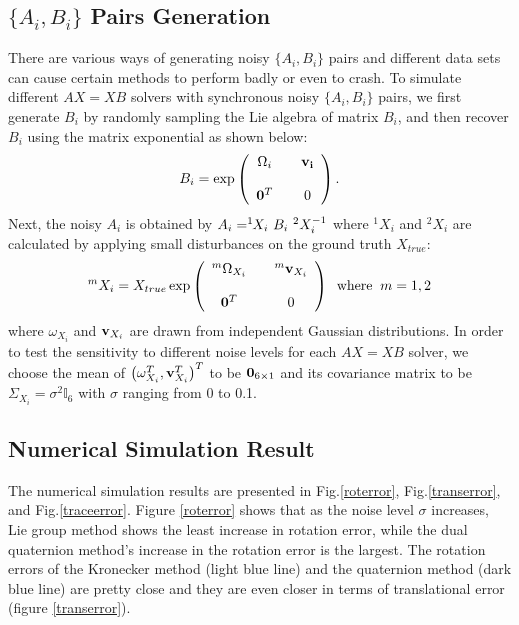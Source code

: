 \documentclass[twocolumn,10pt]{asme2ej}
\begin{document}
\subsection{$\{A_{i}, B_{i}\}$ Pairs Generation}
There are various ways of generating noisy $\{A_{i},B_{i}\}$ pairs and different data sets can cause certain methods to perform badly or even to crash. To simulate different $AX=XB$ solvers with synchronous noisy $\{A_{i},B_{i}\}$ pairs, we first generate $B_{i}$ by randomly sampling the Lie algebra of matrix $B_{i}$, and then recover $B_{i}$ using the matrix exponential as shown below:
\begin{equation}
B_{i} = \exp \left(
\begin{array}{ccc}
\Omega_{i}  & & {\bf v_{i}}  \\ \\
{\bf 0}^T & & 0 \end{array}
\right).
\end{equation} 
Next, the noisy $A_{i}$ is obtained by $A_{i}= ^1\hspace{-0.05in}X_{i}\,\,B_i\,\,^2X_{i}^{-1}$ where $^1X_{i}$ and $^2X_{i}$ are calculated by applying small disturbances on the ground truth $X_{true}$: 
\begin{equation}
^mX_{i} = X_{true}\exp \left(
\begin{array}{ccc}
^m\Omega_{X_{i}}  & & ^m{\bf v}_{X_{i}}  \\ \\
{\bf 0}^T & & 0 \end{array}
\right)
\; \;
\text{where} \; \; m = 1,2
\label{X_disturb}
\end{equation}
where $\omega_{X_{i}}$ and ${\bf v}_{X_{i}}$ are drawn from independent Gaussian distributions. In order to test the sensitivity to different noise levels for each $AX=XB$ solver, we choose the mean of $\left(\omega_{X_{i}}^{T}, {\bf v}_{X_{i}}^{T}\right)^{T}$ to be ${\bf 0}_{6 \times 1}$ and its covariance matrix to be $\Sigma_{X_{i}} = \sigma^{2} \mathbb{I}_{6}$ with $\sigma$ ranging from 0 to 0.1.


\subsection{Numerical Simulation Result}
The numerical simulation results are presented in Fig.\ref{roterror}, Fig.\ref{transerror}, and Fig.\ref{traceerror}. Figure \ref{roterror} shows that as the noise level $\sigma$ increases, Lie group method shows the least increase in rotation error, while the dual quaternion method's increase in the rotation error is the largest. The rotation errors of the Kronecker method (light blue line) and the quaternion method (dark blue line) are pretty close and they are even closer in terms of translational error (figure \ref{transerror}).
\end{document}

